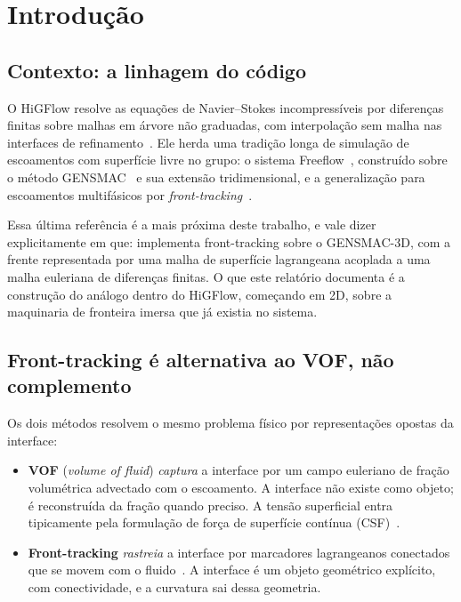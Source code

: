 \section{Introdu\c{c}\~ao}

\subsection{Contexto: a linhagem do c\'odigo}

O HiGFlow resolve as equa\c{c}\~oes de Navier--Stokes incompress\'iveis por
diferen\c{c}as finitas sobre malhas em \'arvore n\~ao graduadas, com
interpola\c{c}\~ao sem malha nas interfaces de refinamento~\cite{sousa2019}. Ele
herda uma tradi\c{c}\~ao longa de simula\c{c}\~ao de escoamentos com superf\'icie
livre no grupo: o sistema Freeflow~\cite{castelo2000}, constru\'ido sobre o
m\'etodo GENSMAC~\cite{tome1994} e sua extens\~ao tridimensional, e a
generaliza\c{c}\~ao para escoamentos multif\'asicos por
\emph{front-tracking}~\cite{sousa2004}.

Essa \'ultima refer\^encia \'e a mais pr\'oxima deste trabalho, e vale dizer
explicitamente em que: \cite{sousa2004} implementa front-tracking sobre o
GENSMAC-3D, com a frente representada por uma malha de superf\'icie
lagrangeana acoplada a uma malha euleriana de diferen\c{c}as finitas. O que este
relat\'orio documenta \'e a constru\c{c}\~ao do an\'alogo dentro do HiGFlow,
come\c{c}ando em 2D, sobre a maquinaria de fronteira imersa que j\'a existia no
sistema.

\subsection{Front-tracking \'e alternativa ao VOF, n\~ao complemento}

Os dois m\'etodos resolvem o mesmo problema f\'isico por representa\c{c}\~oes
opostas da interface:

\begin{itemize}
  \item \textbf{VOF} (\emph{volume of fluid}) \emph{captura} a interface por um
    campo euleriano de fra\c{c}\~ao volum\'etrica advectado com o escoamento. A
    interface n\~ao existe como objeto; \'e reconstru\'ida da fra\c{c}\~ao quando
    preciso. A tens\~ao superficial entra tipicamente pela formula\c{c}\~ao de
    for\c{c}a de superf\'icie cont\'inua (CSF)~\cite{brackbill1992}.
  \item \textbf{Front-tracking} \emph{rastreia} a interface por marcadores
    lagrangeanos conectados que se movem com o fluido~\cite{tryggvason2001}. A
    interface \'e um objeto geom\'etrico expl\'icito, com conectividade, e a
    curvatura sai dessa geometria.
\end{itemize}

